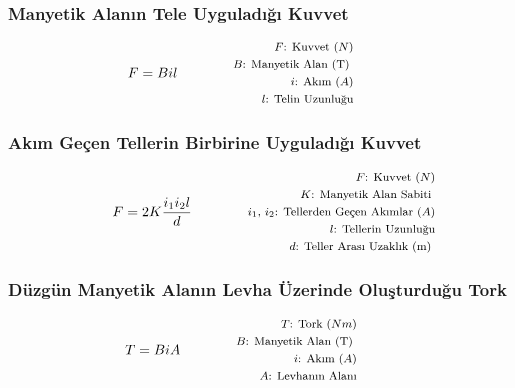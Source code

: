 \subsubsection*{Manyetik Alanın Tele Uyguladığı Kuvvet}
\begin{equation}
    F = B i l \qquad \qquad \parbox{4cm}{\footnotesize$\begin{aligned}
        F\text{: Kuvvet } (N) \\
        B\text{: Manyetik Alan (T) } \\
        i\text{: Akım } (A) \\
        l\text{: Telin Uzunluğu}
\end{aligned}$}
\end{equation}

\subsubsection*{Akım Geçen Tellerin Birbirine Uyguladığı Kuvvet}
\begin{equation}
    F = 2K \frac{i_1 i_2 l}{d} \qquad \qquad \parbox{4cm}{\footnotesize$\begin{aligned}
        F\text{: Kuvvet } (N) \\
        K\text{: Manyetik Alan Sabiti } \\
        i_1\text{, }i_2\text{: Tellerden Geçen Akımlar } (A) \\
        l\text{: Tellerin Uzunluğu} \\
        d\text{: Teller Arası Uzaklık (m) }
\end{aligned}$}
\end{equation}

\subsubsection*{Düzgün Manyetik Alanın Levha Üzerinde Oluşturduğu Tork}
\begin{equation}
    T = B i A \qquad \qquad \parbox{4cm}{\footnotesize$\begin{aligned}
        T\text{: Tork } (Nm) \\
        B\text{: Manyetik Alan (T) } \\
        i\text{: Akım } (A) \\
        A\text{: Levhanın Alanı} \\
\end{aligned}$}
\end{equation}

